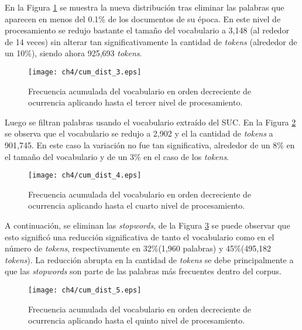 En la Figura \ref{img:cum_dist3} se muestra la nueva distribución tras eliminar las palabras que aparecen en menos del 0.1\% de los documentos de su época. En este nivel de procesamiento se redujo bastante el tamaño del vocabulario a 3,148 (al rededor de 14 veces) sin alterar tan significativamente la cantidad de \textit{tokens} (alrededor de un 10\%), siendo ahora 925,693 \textit{tokens}.\\

\begin{figure}
    \centering
    \texttt{[image: ch4/cum\_dist\_3.eps]}
    \caption{Frecuencia acumulada del vocabulario en orden decreciente de ocurrencia aplicando hasta el tercer nivel de procesamiento.}
    \label{img:cum_dist3}
\end{figure}

Luego se filtran palabras usando el vocabulario extraído del SUC. En la Figura \ref{img:cum_dist4} se observa que el vocabulario se redujo a 2,902 y el la cantidad de \textit{tokens} a 901,745. En este caso la variación no fue tan significativa, alrededor de un 8\% en el tamaño del vocabulario y de un 3\% en el caso de los \textit{tokens}.\\

\begin{figure}
    \centering
    \texttt{[image: ch4/cum\_dist\_4.eps]}
    \caption{Frecuencia acumulada del vocabulario en orden decreciente de ocurrencia aplicando hasta el cuarto nivel de procesamiento.}
    \label{img:cum_dist4}
\end{figure}

A continuación, se eliminan las \textit{stopwords}, de la Figura \ref{img:cum_dist5} se puede observar que esto significó una reducción significativa de tanto el vocabulario como en el número de \textit{tokens}, respectivamente en 32\%(1,960 palabras) y 45\%(495,182 \textit{tokens}). La reducción abrupta en la cantidad de \textit{tokens} se debe principalmente a que las \textit{stopwords} son parte de las palabras más frecuentes dentro del corpus.\\

\begin{figure}
    \centering
    \texttt{[image: ch4/cum\_dist\_5.eps]}
    \caption{Frecuencia acumulada del vocabulario en orden decreciente de ocurrencia aplicando hasta el quinto nivel de procesamiento.}
    \label{img:cum_dist5}
\end{figure}

